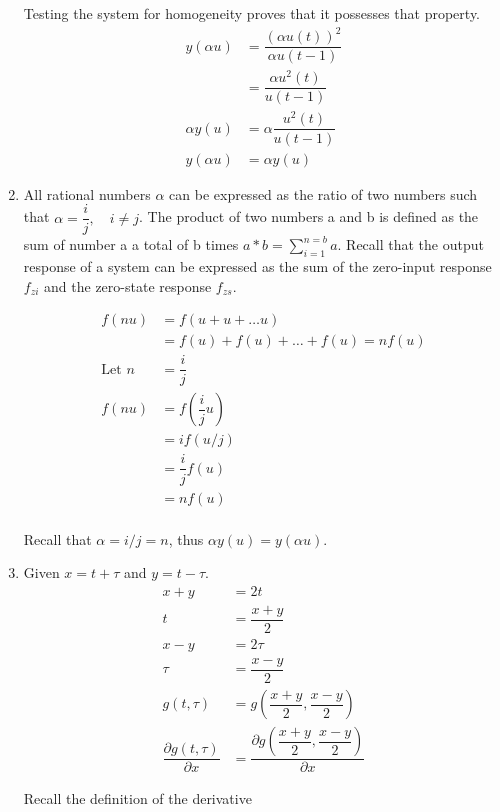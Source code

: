 \documentclass[a4paper,12pt]{article}
\begin{document}
\begin{enumerate}
Testing the system for homogeneity proves that it possesses that property.
\begin{align*}
y (\alpha u) &= \dfrac{(\alpha u(t))^2}{\alpha u(t-1)} \\
&= \dfrac{\alpha u^2(t)}{u(t-1)}\\
\alpha y(u) &= \alpha  \dfrac{u^2(t)}{u(t-1)}\\
 y(\alpha u) &= \alpha y (u)
\end{align*}
\item All rational numbers $\alpha$ can be expressed as the ratio of two numbers such that $\alpha = \dfrac{i}{j}, \quad i\neq j$.
The product of two numbers a and b is defined as the sum of number a a total of b times $a*b = \sum_{i=1}^{n = b} a$.
Recall that the output response of a system can be expressed as the sum of the zero-input response $f_{zi}$ and the zero-state response $f_{zs}$.

\begin{align*}
 f(n u) &= f(u+u+\dots u) \\
 &= f(u) + f(u) + \dots + f(u) = n f(u)\\
 \text{Let } n &= \dfrac{i}{j}\\
 f(nu) &= f(\dfrac{i}{j}u)\\
 &= i f(u/j)\\
 &= \dfrac{i}{j} f(u)\\
 &= n f(u) \\
\end{align*}


Recall that $\alpha = i/j = n$, thus $\alpha y(u) =y (\alpha u)$.


\item Given $x = t + \tau$ and $y = t - \tau$.
\begin{align*}
 x + y &= 2 t \\
 t &= \dfrac{x+y}{2}\\
 x - y &= 2 \tau \\
 \tau &= \dfrac{x-y}{2}\\
 g(t, \tau) &= g(\dfrac{x+y}{2}, \dfrac{x-y}{2})\\
 \dfrac{\partial g(t, \tau)}{\partial x} &= \dfrac{\partial g(\dfrac{x+y}{2}, \dfrac{x-y}{2})}{\partial x}
\end{align*}

Recall the definition of the derivative


\end{enumerate}
\end{document}

